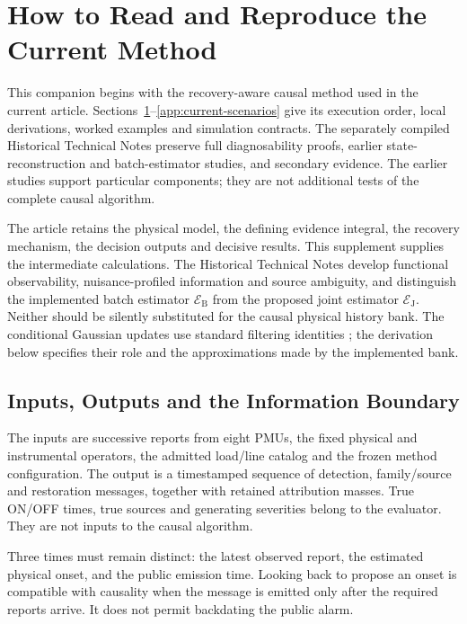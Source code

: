 \section{How to Read and Reproduce the Current Method}
\label{app:causal-walkthrough}

This companion begins with the recovery-aware causal method used in the
current article. Sections~\ref{app:causal-walkthrough}--\ref{app:current-scenarios}
give its execution order, local derivations, worked examples and simulation
contracts. The separately compiled Historical Technical Notes preserve
full diagnosability proofs, earlier state-reconstruction and batch-estimator
studies, and secondary evidence. The earlier studies support particular
components; they are not additional tests of the complete causal algorithm.\AIDraftingCredit{}

The article retains the physical model, the defining evidence integral,
the recovery mechanism, the decision outputs and decisive results. This
supplement supplies the intermediate calculations. The Historical Technical
Notes develop functional observability, nuisance-profiled information and
source ambiguity, and distinguish the implemented batch estimator $\mathcal E_{\mathrm B}$ from
the proposed joint estimator $\mathcal E_{\mathrm J}$. Neither should be
silently substituted for the causal physical history bank.
The conditional Gaussian updates use standard filtering identities
\cite{sarkka2013bayesian}; the derivation below specifies their role and
the approximations made by the implemented bank.

\subsection{Inputs, Outputs and the Information Boundary}

The inputs are successive reports from eight PMUs, the fixed physical and
instrumental operators, the admitted load/line catalog and the frozen
method configuration. The output is a timestamped sequence of detection,
family/source and restoration messages, together with retained attribution
masses. True ON/OFF times, true sources and generating severities belong
to the evaluator. They are not inputs to the causal algorithm.

Three times must remain distinct: the latest observed report, the estimated
physical onset, and the public emission time. Looking back to propose an
onset is compatible with causality when the message is emitted only after
the required reports arrive. It does not permit backdating the public alarm.

